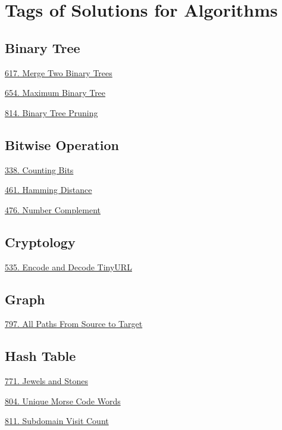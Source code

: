 \tocless\section{Tags of Solutions for Algorithms}
\label{sec:algo_tag}

\subsection*{Binary Tree}
\begin{flushleft}
    \hyperref[algo:617]{617. Merge Two Binary Trees}

    \hyperref[algo:654]{654. Maximum Binary Tree}

    \hyperref[algo:814]{814. Binary Tree Pruning}
\end{flushleft}

\subsection*{Bitwise Operation}
\begin{flushleft}
    \hyperref[algo:338]{338. Counting Bits}

    \hyperref[algo:461]{461. Hamming Distance}
    
    \hyperref[algo:476]{476. Number Complement}
\end{flushleft}

\subsection*{Cryptology}
\begin{flushleft}
    \hyperref[algo:535]{535. Encode and Decode TinyURL}
\end{flushleft}

\subsection*{Graph}
\begin{flushleft}
    \hyperref[algo:797]{797. All Paths From Source to Target}
\end{flushleft}

\subsection*{Hash Table}
\begin{flushleft}
    \hyperref[algo:771]{771. Jewels and Stones}
    
    \hyperref[algo:804]{804. Unique Morse Code Words}
    
    \hyperref[algo:811]{811. Subdomain Visit Count}
\end{flushleft}

